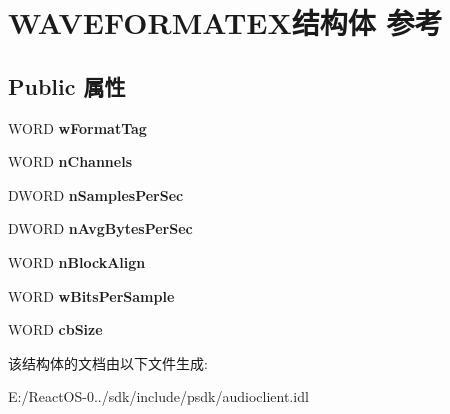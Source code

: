 \hypertarget{struct_w_a_v_e_f_o_r_m_a_t_e_x}{}\section{W\+A\+V\+E\+F\+O\+R\+M\+A\+T\+E\+X结构体 参考}
\label{struct_w_a_v_e_f_o_r_m_a_t_e_x}
\subsection*{Public 属性}
\begin{DoxyCompactItemize}
\item 
\mbox{\label{struct_w_a_v_e_f_o_r_m_a_t_e_x_abb3832c1dfafd1c01e54029860293df8}} 
W\+O\+RD {\bfseries w\+Format\+Tag}
\item 
\mbox{\label{struct_w_a_v_e_f_o_r_m_a_t_e_x_a0435ba65ae0bd0ad26528c4d4bb1c159}} 
W\+O\+RD {\bfseries n\+Channels}
\item 
\mbox{\label{struct_w_a_v_e_f_o_r_m_a_t_e_x_a9b8adc457a531e770ea2a22e5d98a107}} 
D\+W\+O\+RD {\bfseries n\+Samples\+Per\+Sec}
\item 
\mbox{\label{struct_w_a_v_e_f_o_r_m_a_t_e_x_a2bc1bfb42d456fbf605d84aa587da440}} 
D\+W\+O\+RD {\bfseries n\+Avg\+Bytes\+Per\+Sec}
\item 
\mbox{\label{struct_w_a_v_e_f_o_r_m_a_t_e_x_a611e0bfe05ffa080664e7a72b24af9c0}} 
W\+O\+RD {\bfseries n\+Block\+Align}
\item 
\mbox{\label{struct_w_a_v_e_f_o_r_m_a_t_e_x_a8188f473ba820ea6255735e4f7f3c941}} 
W\+O\+RD {\bfseries w\+Bits\+Per\+Sample}
\item 
\mbox{\label{struct_w_a_v_e_f_o_r_m_a_t_e_x_a124a36cf4618d175dae42a6841ff91a4}} 
W\+O\+RD {\bfseries cb\+Size}
\end{DoxyCompactItemize}


该结构体的文档由以下文件生成\+:\begin{DoxyCompactItemize}
\item 
E\+:/\+React\+O\+S-\/0../sdk/include/psdk/audioclient.\+idl\end{DoxyCompactItemize}
